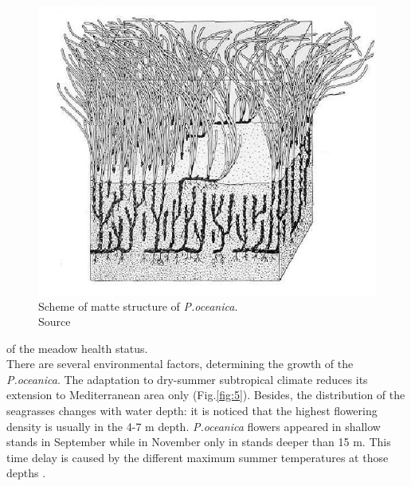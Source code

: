 \documentclass[10pt, a4paper]{article}
\begin{document}
\begin{figure}
	\centering
	\includegraphics[scale=0.15]{Fig-1-7.jpg}
	\caption{Scheme of matte structure of \textit{	P.oceanica}.\\ Source \cite{Pergent90}\label{Pergent90}}
	\label{fig:7}
\end{figure}

of the meadow health status. \\
There are several environmental factors, determining the growth of the \textit{P.oceanica}. The adaptation
to dry-summer subtropical climate reduces its extension to Mediterranean area only (Fig.\ref{fig:5}).
Besides, the distribution of the seagrasses changes with water depth: it is noticed \cite{Dural10}\label{Dural10} that
the highest flowering density is usually in the 4-7 m depth. 
\textit{P.oceanica} flowers appeared in shallow
stands in September while in November only in stands deeper than 15 m. This time delay is caused by
the different maximum summer temperatures at those depths \cite{Buia91}\label{Buia91}.
\end{document}

